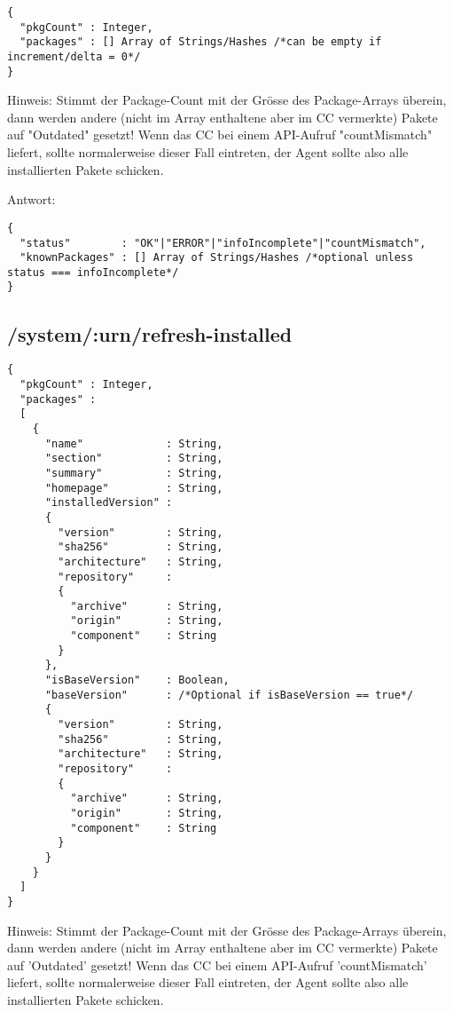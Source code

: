 \begin{verbatim}
{
  "pkgCount" : Integer,
  "packages" : [] Array of Strings/Hashes /*can be empty if increment/delta = 0*/
}
\end{verbatim}

Hinweis: Stimmt der Package-Count mit der Grösse des Package-Arrays überein, dann werden andere (nicht im Array enthaltene aber im CC vermerkte) Pakete auf "Outdated" gesetzt! Wenn das CC bei einem API-Aufruf "countMismatch" liefert, sollte normalerweise dieser Fall eintreten, der Agent sollte also alle installierten Pakete schicken.


Antwort:

\begin{verbatim}
{
  "status"        : "OK"|"ERROR"|"infoIncomplete"|"countMismatch",
  "knownPackages" : [] Array of Strings/Hashes /*optional unless status === infoIncomplete*/
}
\end{verbatim}


\subsection*{/system/:urn/refresh-installed}

\begin{verbatim}
{
  "pkgCount" : Integer,
  "packages" :
  [
    {
      "name"             : String,
      "section"          : String,
      "summary"          : String,
      "homepage"         : String,
      "installedVersion" :
      {
        "version"        : String,
        "sha256"         : String,
        "architecture"   : String,
        "repository"     :
        {
          "archive"      : String,
          "origin"       : String,
          "component"    : String
        }
      },
      "isBaseVersion"    : Boolean,
      "baseVersion"      : /*Optional if isBaseVersion == true*/
      {
        "version"        : String,
        "sha256"         : String,
        "architecture"   : String,
        "repository"     :
        {
          "archive"      : String,
          "origin"       : String,
          "component"    : String
        }
      }
    }
  ]
}
\end{verbatim}

Hinweis: Stimmt der Package-Count mit der Grösse des Package-Arrays überein, dann werden andere (nicht im Array enthaltene aber im CC vermerkte) Pakete auf 'Outdated' gesetzt! Wenn das CC bei einem API-Aufruf 'countMismatch' liefert, sollte normalerweise dieser Fall eintreten, der Agent sollte also alle installierten Pakete schicken.


